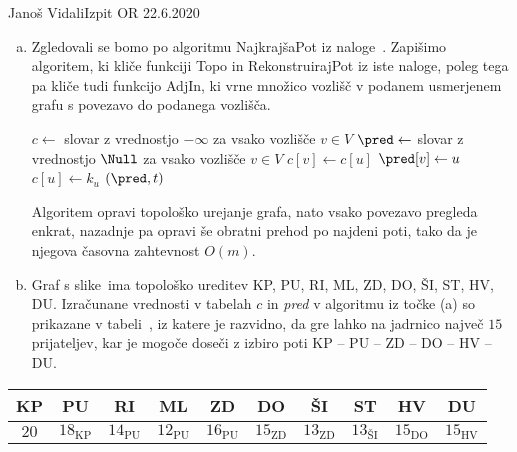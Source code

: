 \begin{naloga}{Janoš Vidali}{Izpit OR 22.6.2020}
\begin{odgovor}
\begin{enumerate}[(a)]
\item Zgledovali se bomo po algoritmu {\sc NajkrajšaPot} iz naloge~\res[topo].
Zapišimo algoritem,
ki kliče funkciji {\sc Topo} in {\sc RekonstruirajPot} iz iste naloge,
poleg tega pa kliče tudi funkcijo {\sc AdjIn},
ki vrne množico vozlišč v podanem usmerjenem grafu
s povezavo do podanega vozlišča.
\begin{small}
\begin{algorithmic}
	\State $c \gets$ slovar z vrednostjo $-\infty$ za vsako vozlišče $v \in V$
	\State $\pred \gets$ slovar z vrednostjo $\Null$ za vsako vozlišče $v \in V$
				\State $c[v] \gets c[u]$
				\State $\pred[v] \gets u$
			\EndIf
		\EndFor
            \State $c[u] \gets k_u$
        \EndIf
	\EndFor
    \State {}$(\pred, t)$
\EndFunction
\end{algorithmic}
\end{small}
Algoritem opravi topološko urejanje grafa,
nato vsako povezavo pregleda enkrat,
nazadnje pa opravi še obratni prehod po najdeni poti,
tako da je njegova časovna zahtevnost $O(m)$.

\item Graf s slike~\fig ima topološko ureditev
KP, PU, RI, ML, ZD, DO, ŠI, ST, HV, DU.
Izračunane vrednosti v tabelah $c$ in {\sl pred} v algoritmu iz točke (a)
so prikazane v tabeli~\tab,
iz katere je razvidno,
da gre lahko na jadrnico največ $15$ prijateljev,
kar je mogoče doseči z izbiro poti
KP -- PU -- ZD -- DO -- HV -- DU.
\end{enumerate}
%
\begin{tabela}
\begin{tabular}{cccccccccc}
KP & PU & RI & ML & ZD & DO & ŠI & ST & HV & DU \\
\hline
$20$ & $18_\text{KP}$ & $14_\text{PU}$ & $12_\text{PU}$ & $16_\text{PU}$ &
$15_\text{ZD}$ & $13_\text{ZD}$ & $13_\text{ŠI}$ & $15_\text{DO}$ & $15_\text{HV}$
\end{tabular}
\end{tabela}
\end{odgovor}
\end{naloga}

